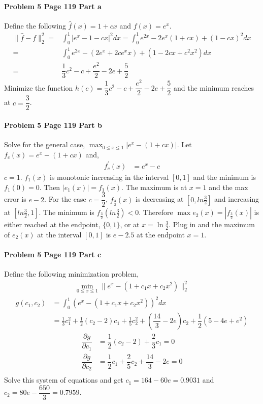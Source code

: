\documentclass[paper=a4, fontsize=11pt]{scrartcl} %
\numberwithin{equation}{section} %
\numberwithin{figure}{section} %
\numberwithin{table}{section} %
\begin{document}
\newpage
\paragraph{\textbf{Problem 5 Page 119 Part a}}
Define the following $ \hat{f}(x)=1+cx $ and $ f(x)=e^x $.\\
\begin{align*}
	\|\hat{f}-f\|^2_2=&\int_{0}^{1}|e^x-1-cx|^2 dx=\int_{0}^{1}e^{2x}-2e^x(1+cx)+(1-cx)^2dx\\
	=&\int_{0}^{1}e^{2x}-(2e^x+2ce^xx)+(1-2cx+c^2x^2)dx\\
	=&\dfrac{1}{3}c^2-c+\dfrac{e^2}{2}-2 e + \dfrac{5}{2}
\end{align*}
Minimize the function $ h(c)=\dfrac{1}{3}c^2-c+\dfrac{e^2}{2}-2 e + \dfrac{5}{2} $ and the minimum reaches at $ c=\dfrac{3}{2} $.

\paragraph{\textbf{Problem 5 Page 119 Part b}}
Solve for the general case, $ \displaystyle\max_{0 \leq x\leq 1} |e^x-(1+cx)| $. Let $  f_c(x)=e^x-(1+cx) $ and,
\begin{align*}
	f_c^\prime (x)&=e^x-c
\end{align*}
$ c=1 $. $ f_1(x) $ is monotonic increasing in the interval $ [0,1] $ and the minimum is $ f_1(0)=0$. Then $ |e_1(x)|=f_1(x) $. The maximum is at $ x=1 $ and the max error is $ e-2 $. For the case $ c=\dfrac{3}{2} $, $ f_{\frac{3}{2}}(x)$ is decreasing at $ [0,ln \frac{3}{2}] $ and increasing at $ [ln \frac{3}{2},1] $. The minimum is $ f_{\frac{3}{2}}(ln\frac{3}{2})<0 $. Therefore $ \max e_2(x)=|f_{\frac{3}{2}}(x)| $ is either reached at the endpoint, $ \{0, 1\} $, or at $ x=\ln \frac{3}{2} $. Plug in and the maximum of $ e_2(x) $ at the interval $ [0,1] $ is $ e-2.5  $ at the endpoint $ x=1 $.

\paragraph{\textbf{Problem 5 Page 119 Part c}}
Define the following minimization problem,
\begin{align*}
	\min_{0\leq x\leq 1} \|e^x-(1+c_1x+c_2x^2) \|_2^2
\end{align*}
\begin{align*}
	g(c_1,c_2) &= \int_{0}^{1}(e^x-(1+c_1x+c_2x^2))^2dx\\
                &=\frac{1}{3}c_1^2+\frac{1}{2}(c_2-2)c_1+\frac{1}{5}c_2^2+\left(\dfrac{14}{3}-2e \right) c_2 + \dfrac{1}{2} \left( 5 - 4e + e^2\right)
\end{align*}
\begin{align*}
	\dfrac{\partial g}{\partial c_1}&=\dfrac{1}{2}(c_2-2)+\dfrac{2}{3}c_1=0\\
	\dfrac{\partial g}{\partial c_2}&=\dfrac{1}{2}c_1+\dfrac{2}{5}c_2+\dfrac{14}{3}-2e=0\\
\end{align*}
Solve this system of equations and get $ c_1=164-60e = 0.9031 $ and $ c_2=80e - \dfrac{650}{3}= 0.7959 $.
\end{document}
